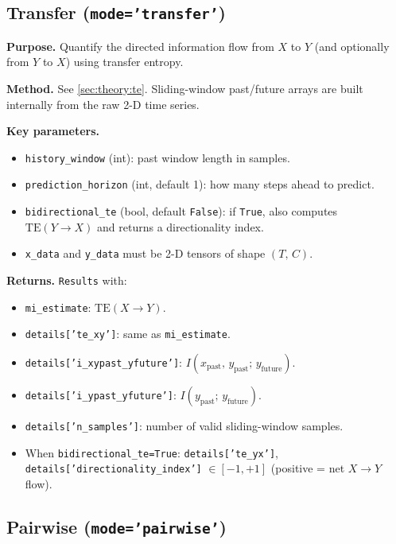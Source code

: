 \documentclass[12pt]{article}
\newcommand{\api}[1]{\texttt{#1}}
\begin{document}
\subsection{Transfer (\texttt{mode='transfer'})}
\label{sec:modes:transfer}

\textbf{Purpose.}  Quantify the directed information flow from $X$ to $Y$
(and optionally from $Y$ to $X$) using transfer entropy.

\textbf{Method.}  See \cref{sec:theory:te}.  Sliding-window past/future
arrays are built internally from the raw 2-D time series.

\textbf{Key parameters.}
\begin{itemize}[leftmargin=*]
  \item \api{history\_window} (int): past window length in samples.
  \item \api{prediction\_horizon} (int, default 1): how many steps ahead
        to predict.
  \item \api{bidirectional\_te} (bool, default \api{False}): if
        \api{True}, also computes $\mathrm{TE}(Y\to X)$ and returns a
        directionality index.
  \item \api{x\_data} and \api{y\_data} must be 2-D tensors of shape
        $(T,\,C)$.
\end{itemize}

\textbf{Returns.}  \api{Results} with:
\begin{itemize}[leftmargin=*]
  \item \api{mi\_estimate}: $\mathrm{TE}(X\to Y)$.
  \item \api{details['te\_xy']}: same as \api{mi\_estimate}.
  \item \api{details['i\_xypast\_yfuture']}: $I(x_{\mathrm{past}},\,y_{\mathrm{past}};\,y_{\mathrm{future}})$.
  \item \api{details['i\_ypast\_yfuture']}: $I(y_{\mathrm{past}};\,y_{\mathrm{future}})$.
  \item \api{details['n\_samples']}: number of valid sliding-window
        samples.
  \item When \api{bidirectional\_te=True}: \api{details['te\_yx']},
        \api{details['directionality\_index']} $\in [-1,+1]$ (positive
        = net $X\to Y$ flow).
\end{itemize}

\subsection{Pairwise (\texttt{mode='pairwise'})}
\label{sec:modes:pairwise}
\end{document}
